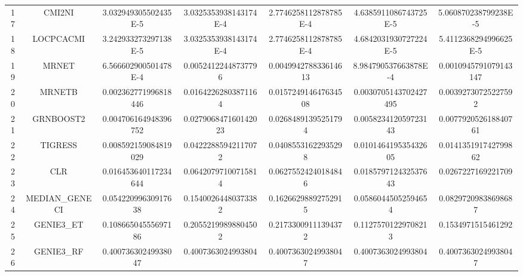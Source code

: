 \documentclass[a4paper,10pt]{article}
\begin{document}
\begin{landscape}
\begin{table}[!htp]
\begin{tabular}{ccccccc}
17&CMI2NI&3.032949305502435E-5&3.0325353938143174E-4&2.7746258112878785E-4&4.6385911086743725E-5&5.060870238799238E-5\\
18&LOCPCACMI&3.242933273297138E-5&3.0325353938143174E-4&2.7746258112878785E-4&4.6842031930727224E-5&5.4112368294996625E-5\\
19&MRNET&6.566602900501478E-4&0.00524122448737796&0.004994278833614613&8.984790537663878E-4&0.0010945791079143147\\
20&MRNETB&0.002362771996818446&0.01642262803871164&0.015724914647634508&0.0030705143702427495&0.00392730725227592\\
21&GRNBOOST2&0.004706164948396752&0.027906847160142023&0.02684891395251794&0.005823412059723143&0.007792052618840761\\
22&TIGRESS&0.008592159084819029&0.04222885942117072&0.04085531622935298&0.010146419535432605&0.014135191742799862\\
23&CLR&0.016453640117234644&0.06420797100715814&0.06275524240184846&0.018579712432537643&0.0267227169221709\\
24&MEDIAN_GENECI&0.05422099630917638&0.15400264480373382&0.16266298892752915&0.05860445052594654&0.08297209838698687\\
25&GENIE3_ET&0.10866504555697186&0.20552199898804502&0.21733009111394372&0.11275701229708213&0.1534971515461292\\
26&GENIE3_RF&0.40073630249938047&0.4007363024993804&0.40073630249938047&0.4007363024993804&0.40073630249938047\\
\hline
\end{tabular}
\end{table}


\newpage


\end{landscape}
\end{document}
